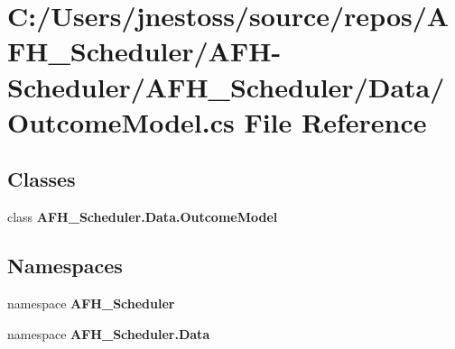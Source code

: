 \section{C\+:/\+Users/jnestoss/source/repos/\+A\+F\+H\+\_\+\+Scheduler/\+A\+F\+H-\/\+Scheduler/\+A\+F\+H\+\_\+\+Scheduler/\+Data/\+Outcome\+Model.cs File Reference}
\label{_outcome_model_8cs}
\subsection*{Classes}
\begin{DoxyCompactItemize}
\item 
class \textbf{ A\+F\+H\+\_\+\+Scheduler.\+Data.\+Outcome\+Model}
\end{DoxyCompactItemize}
\subsection*{Namespaces}
\begin{DoxyCompactItemize}
\item 
namespace \textbf{ A\+F\+H\+\_\+\+Scheduler}
\item 
namespace \textbf{ A\+F\+H\+\_\+\+Scheduler.\+Data}
\end{DoxyCompactItemize}
